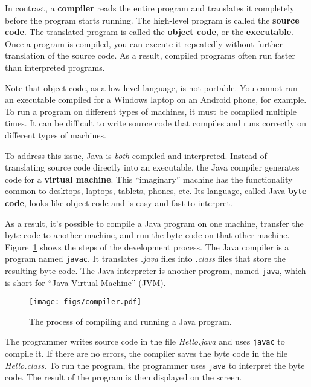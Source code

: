 
In contrast, a {\bf compiler} reads the entire program and translates it completely before the program starts running.
The high-level program is called the {\bf source code}.
The translated program is called the {\bf object code}, or the {\bf executable}.
Once a program is compiled, you can execute it repeatedly without further translation of the source code.
As a result, compiled programs often run faster than interpreted programs.

Note that object code, as a low-level language, is not portable.
You cannot run an executable compiled for a Windows laptop on an Android phone, for example.
To run a program on different types of machines, it must be compiled multiple times.
It can be difficult to write source code that compiles and runs correctly on different types of machines.


To address this issue, Java is {\em both} compiled and interpreted.
Instead of translating source code directly into an executable, the Java compiler generates code for a {\bf virtual machine}.
This ``imaginary'' machine has the functionality common to desktops, laptops, tablets, phones, etc.
Its language, called Java {\bf byte code}, looks like object code and is easy and fast to interpret.


As a result, it's possible to compile a Java program on one machine, transfer the byte code to another machine, and run the byte code on that other machine.
Figure~\ref{fig.compiler} shows the steps of the development process.
The Java compiler is a program named {\tt javac}.
It translates {\it .java} files into {\it .class} files that store the resulting byte code.
The Java interpreter is another program, named {\tt java}, which is short for ``Java Virtual Machine'' (JVM).

\begin{figure}[!ht]
\begin{center}
\texttt{[image: figs/compiler.pdf]}
\caption{The process of compiling and running a Java program.}
\label{fig.compiler}
\end{center}
\end{figure}

The programmer writes source code in the file {\it Hello.java} and uses {\tt javac} to compile it.
If there are no errors, the compiler saves the byte code in the file {\it Hello.class}.
To run the program, the programmer uses {\tt java} to interpret the byte code.
The result of the program is then displayed on the screen.

